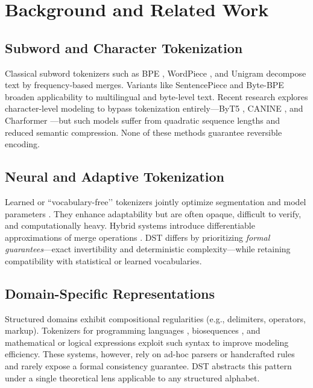 \section{Background and Related Work}
\label{sec:related}

\subsection{Subword and Character Tokenization}

Classical subword tokenizers such as BPE \citep{gage1994bpe}, WordPiece \citep{wu2016google}, and Unigram \citep{kudo2018sentencepiece} decompose text by frequency-based merges.  
Variants like SentencePiece \citep{kudo2018sentencepiece} and Byte-BPE \citep{radford2019gpt2} broaden applicability to multilingual and byte-level text.  
Recent research explores character-level modeling to bypass tokenization entirely—ByT5 \citep{xue2022byt5}, CANINE \citep{clark2022canine}, and Charformer \citep{tay2022charformer}—but such models suffer from quadratic sequence lengths and reduced semantic compression.  
None of these methods guarantee reversible encoding.

\subsection{Neural and Adaptive Tokenization}

Learned or “vocabulary-free’’ tokenizers jointly optimize segmentation and model parameters \citep{taylor2021learned, kaufman2023soft}.  
They enhance adaptability but are often opaque, difficult to verify, and computationally heavy.  
Hybrid systems introduce differentiable approximations of merge operations \citep{wang2023neural, huang2023adapttok}.  
DST differs by prioritizing \emph{formal guarantees}—exact invertibility and deterministic complexity—while retaining compatibility with statistical or learned vocabularies.

\subsection{Domain-Specific Representations}

Structured domains exhibit compositional regularities (e.g., delimiters, operators, markup).  
Tokenizers for programming languages \citep{feng2020codebert, wang2021codet5, ahmad2021unified}, biosequences \citep{ji2021dnabert, zhou2023proteinbert}, and mathematical or logical expressions \citep{han2023mathbert} exploit such syntax to improve modeling efficiency.  
These systems, however, rely on ad-hoc parsers or handcrafted rules and rarely expose a formal consistency guarantee.  
DST abstracts this pattern under a single theoretical lens applicable to any structured alphabet.

